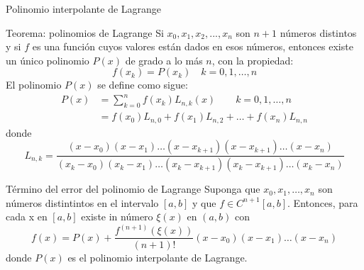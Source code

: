 \begin{frame}{Polinomio interpolante de Lagrange}
\small
\begin{block}{Teorema: polinomios de Lagrange}
Si $x_0, x_1, x_2,..., x_n$ son $n+1$ números distintos y si $f$ es una función cuyos valores están dados en esos números, entonces existe un único polinomio $P(x)$ de grado a lo más $n$, con la propiedad:
$$f(x_k)=P(x_k)\quad k=0, 1, \dots, n$$
El polinomio $P(x)$ se define como sigue:
\begin{align*}
P(x)&=\sum_{k=0}^{n}f(x_k)L_{n,k}(x)\qquad k=0, 1, \dots, n\\
    &=f(x_0)L_{n,0}+f(x_1)L_{n,2}+\dots+f(x_n)L_{n,n}
\end{align*}
donde
$$L_{n,k}=\frac{(x-x_0)(x-x_1)\dots(x-x_{k+1})(x-x_{k+1})\dots (x-x_n)}{(x_k-x_0)(x_k-x_1)\dots(x_k-x_{k+1})(x_k-x_{k+1})\dots (x_k-x_n)}$$
\end{block}
\end{frame}
\begin{frame}
\begin{block}{Término del error del polinomio de Lagrange}
Suponga que $x_0, x_1, \dots, x_n$ son números distintintos en el intervalo $[a,b]$ y que $f \in C^{n+1}[a,b]$. Entonces, para cada x en $[a,b]$ existe in número $\xi(x)$ en $(a,b)$ con 
$$f(x)=P(x)+\frac{f^{(n+1)}(\xi(x))}{(n+1)!}(x-x_0)(x-x_1)\dots (x-x_n)$$
donde $P(x)$ es el polinomio interpolante de Lagrange.
\end{block}
\end{frame}

